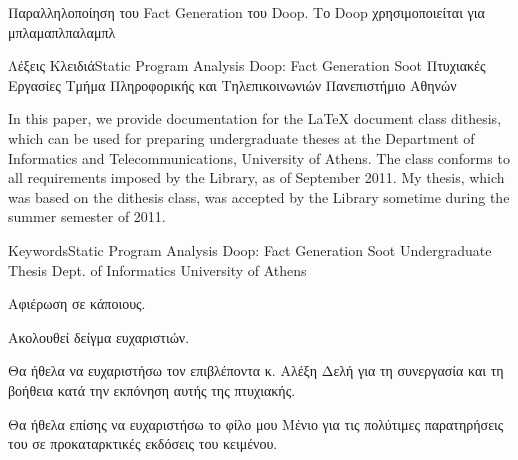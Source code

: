 \documentclass{dithesis}
\begin{document}
\maketitle

\begin{thesisabstract}[Περίληψη]
    Παραλληλοποίηση του Fact Generation του Doop. Το Doop χρησιμοποιείται για μπλαμαπλπαλαμπλ

                 {Λέξεις Κλειδιά}{Static Program Analysis}
                                 {Doop: Fact Generation}
                                 {Soot}
                                 {Πτυχιακές Εργασίες}
                                 {Τμήμα Πληροφορικής και Τηλεπικοινωνιών}
                                 {Πανεπιστήμιο Αθηνών}
\end{thesisabstract}

\begin{thesisabstract}[Abstract]
    In this paper, we provide documentation for the \LaTeX{} document class
    dithesis, which can be used for preparing undergraduate theses at the 
    Department of Informatics and Telecommunications, University of Athens.
    The class conforms to all requirements imposed by the Library, as of September
    2011.
    My thesis, which was based on the dithesis class, was accepted by the Library
    sometime during the summer semester of 2011.

                                {Keywords}{Static Program Analysis}
                                {Doop: Fact Generation}
                                {Soot}
                                {Undergraduate Thesis}
                                {Dept. of Informatics}
                                {University of Athens}
\end{thesisabstract}

\begin{thesisdedication}
Αφιέρωση σε κάποιους.
\end{thesisdedication}

\begin{thesisacknowledgments}[Ευχαριστίες]
    Ακολουθεί δείγμα ευχαριστιών.

    Θα ήθελα να ευχαριστήσω τον επιβλέποντα κ. Αλέξη Δελή για τη συνεργασία και τη
    βοήθεια κατά την εκπόνηση αυτής της πτυχιακής.

    Θα ήθελα επίσης να ευχαριστήσω το φίλο μου Μένιο για τις πολύτιμες
    παρατηρήσεις του σε προκαταρκτικές εκδόσεις του κειμένου.
\end{thesisacknowledgments}
\end{document}
